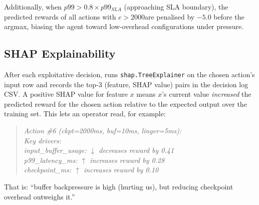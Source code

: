 Additionally, when $p99 > 0.8 \times p99_{SLA}$ (approaching SLA boundary),
the predicted rewards of all actions with $c > 2000$\ms are penalised by
$-5.0$ before the argmax, biasing the agent toward low-overhead
configurations under pressure.

\subsection{SHAP Explainability}
After each exploitative decision, \xtal runs
\texttt{shap.TreeExplainer} on the chosen action's input row and records
the top-3 (feature, SHAP value) pairs in the decision log CSV.
A positive SHAP value for feature $x$ means $x$'s current value
\emph{increased} the predicted reward for the chosen action relative
to the expected output over the training set.
This lets an operator read, for example:

\begin{quote}\small
\textit{Action \#6 (ckpt=2000ms, buf=10ms, linger=5ms): \\
  Key drivers:\\
  \quad input\_buffer\_usage: $\downarrow$ decreases reward by 0.41\\
  \quad p99\_latency\_ms: $\uparrow$ increases reward by 0.28\\
  \quad checkpoint\_ms: $\uparrow$ increases reward by 0.10}
\end{quote}

That is: ``buffer backpressure is high (hurting us), but reducing
checkpoint overhead outweighs it.''

